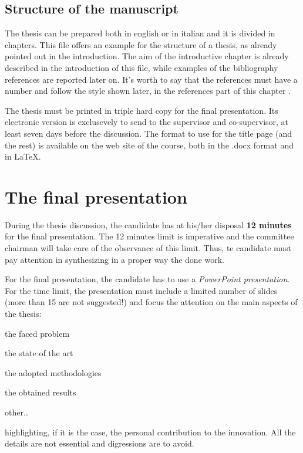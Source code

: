 \subsection{Structure of the manuscript}

The thesis can be prepared both in english or in italian and it is divided in chapters. This file offers an example for the structure of a thesis, as already pointed out in the introduction. The aim of the introductive chapter is already described in the introduction of this file, while examples of the bibliography references are reported later on. It's worth to say that the references must have a number and follow the style shown later, in the references part of this chapter \cite{example:book} \cite{example:article} \cite{example:web_docs}.

The thesis must be printed in triple hard copy for the final presentation. Its electronic version is exclusevely to send to the supervisor and co-supervisor, at least seven days before the discussion. The format to use for the title page (and the rest) is available on the web site of the course, both in the .docx format and in \LaTeX.

\section{The final presentation}

During the thesis discussion, the candidate has at his/her disposal {\bfseries 12 minutes} for the final presentation. The 12 minutes limit is imperative and the committee chairman will take care of the observance of this limit. Thus, te candidate must pay attention in synthesizing in a proper way the done work.

For the final presentation, the candidate has to use a \emph{PowerPoint presentation}. For the time limit, the presentation must include a limited number of slides (more than 15 are not suggested!) and focus the attention on the main aspects of the thesis:
\begin{compactitem}
\item the faced problem
\item the state of the art
\item the adopted methodologies
\item the obtained results
\item other\dots
\end{compactitem}
highlighting, if it is the case, the personal contribution to the innovation. All the details are not essential and digressions are to avoid.

